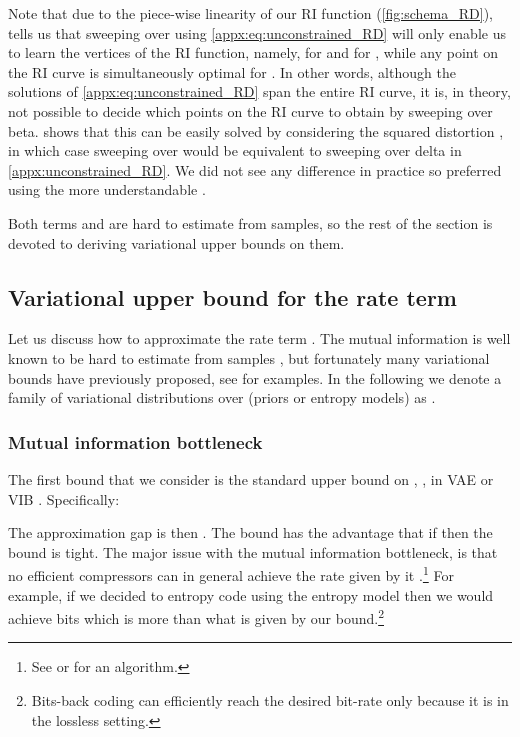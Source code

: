 \documentclass[final]{article}
\begin{document}
Note that due to the piece-wise linearity of our RI function (\cref{fig:schema_RD}), \citet{kolchinsky_caveats_2019} tells us that sweeping over  using \cref{appx:eq:unconstrained_RD} will only enable us to learn the vertices of the RI function, namely,  for  and  for ,
while any point on the RI curve is simultaneously optimal for .
In other words, although the solutions of \cref{appx:eq:unconstrained_RD} span the entire RI curve, it is, in theory, not possible to decide which points on the RI curve to obtain by sweeping over beta.
\citet{kolchinsky_caveats_2019} shows that this can be easily solved by considering the squared distortion , in which case sweeping over  would be equivalent to sweeping over delta  in \cref{appx:unconstrained_RD}.
We did not see any difference in practice so preferred using the more understandable  .

Both terms  and  are hard to estimate from samples, so the rest of the section is devoted to deriving variational upper bounds on them.


\subsection{Variational upper bound for the rate term \texorpdfstring{}{I[Z;X]}}
\label{appx:variational_rate}


Let us discuss how to approximate the rate term .
The mutual information is well known to be hard to estimate from samples \cite{paninski_estimation_2003,mcallester_formal_2020}, but fortunately many variational bounds have previously proposed, see \citet{poole_variational_2019} for examples.
In the following we denote a family of variational distributions over  (priors or entropy models) as .


\subsubsection{Mutual information bottleneck}
\label{appx:mi_bottleneck}

 The first bound that we consider is the standard upper bound on , \eg, in VAE \cite{kingma_auto-encoding_2014} or VIB \cite{alemi_deep_2017}.
Specifically:

The approximation gap is then .
The bound has the advantage that if  then the bound is tight.
The major issue with the mutual information bottleneck, is that no efficient compressors can in general achieve the rate given by it \citep{agustsson_universally_2020}.\footnote{
See \citet{flamich_compressing_2020} or \citet{schulman_sending_2020} for an  algorithm.
}
For example, if we decided to entropy code  using the entropy model  then we would achieve  bits which is  more than what is given by our bound.\footnote{
Bits-back coding \citep{wallace_classification_1990} can efficiently reach the desired bit-rate only because it is in the lossless setting.
}
\end{document}
